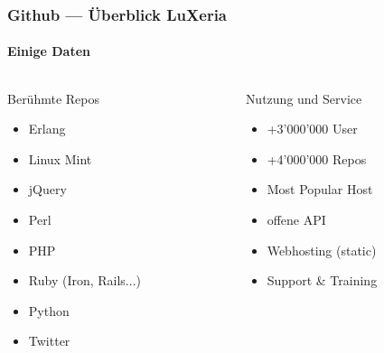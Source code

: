 \begin{frame}
    \frametitle{Github --- Überblick \hfill{} \footnotesize{LuXeria}}
    \framesubtitle{Einige Daten}
    \begin{columns}
        \begin{column}{5cm}
            \begin{block}{Berühmte Repos}
                \begin{itemize}
                    \item Erlang
                    \item Linux Mint
                    \item jQuery
                    \item Perl
                    \item PHP
                    \item Ruby (Iron, Rails...)
                    \item Python
                    \item Twitter
                \end{itemize}
            \end{block}
        \end{column}
        \begin{column}{5cm}
            \begin{block}{Nutzung und Service}
                \begin{itemize}
                    \item +3'000'000 User
                    \item +4'000'000 Repos
                    \item Most Popular Host
                    \item offene API
                    \item Webhosting (static)
                    \item Support \& Training
                \end{itemize}
            \end{block}
        \end{column}
    \end{columns}
\end{frame}

